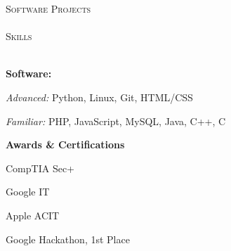 \documentclass[a4paper]{article}
\newcommand{\lineunder} {
    \vspace*{-8pt} \\
    \hspace*{-18pt} \hrulefill \\
}
\newcommand{\header} [1] {
    {\hspace*{-18pt}\vspace*{6pt} \textsc{#1}}
    \vspace*{-6pt} \lineunder
}
\begin{document}
\header{Software Projects}



%

\header{Skills}
\begin{minipage}{2in}
\textbf{Software:}
    \begin{description}
        \vspace{-2mm}
        \item \textit{Advanced:} Python, Linux, Git, HTML/CSS
        \item \textit {Familiar:} PHP, JavaScript, MySQL, Java, C++, C
    \end{description}
\end{minipage}
\hfill
\begin{minipage}{2in}
\vspace{4mm}
\textbf{Awards \& Certifications}
    \begin{description}
        \vspace{-2mm}
        \item CompTIA Sec+
        \item Google IT
        \item Apple ACIT
        \item Google Hackathon, 1st Place
    \end{description}
\end{minipage}

\ 
\end{document}
